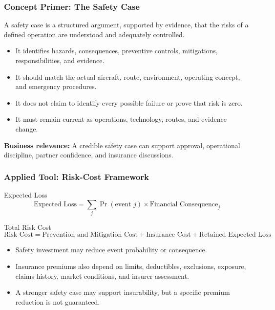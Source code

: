 \documentclass{beamer}
\begin{document}
\begin{frame}[t]
\frametitle{Concept Primer: The Safety Case}
A safety case is a structured argument, supported by evidence, that the risks of a defined operation are understood and adequately controlled.
\begin{itemize}
\item It identifies hazards, consequences, preventive controls, mitigations, responsibilities, and evidence.
\item It should match the actual aircraft, route, environment, operating concept, and emergency procedures.
\item It does not claim to identify every possible failure or prove that risk is zero.
\item It must remain current as operations, technology, routes, and evidence change.
\end{itemize}
\textbf{Business relevance:} A credible safety case can support approval, operational discipline, partner confidence, and insurance discussions.
\end{frame}

\begin{frame}[t]
\frametitle{Applied Tool: Risk-Cost Framework}
\begin{block}{Expected Loss}
\[
\text{Expected Loss}=\sum_j \Pr(\text{event }j)\times\text{Financial Consequence}_j
\]
\end{block}
\begin{block}{Total Risk Cost}
\[
\text{Risk Cost}=\text{Prevention and Mitigation Cost}+\text{Insurance Cost}+\text{Retained Expected Loss}
\]
\end{block}
\begin{itemize}
\item Safety investment may reduce event probability or consequence.
\item Insurance premiums also depend on limits, deductibles, exclusions, exposure, claims history, market conditions, and insurer assessment.
\item A stronger safety case may support insurability, but a specific premium reduction is not guaranteed.
\end{itemize}
\end{frame}
\end{document}
